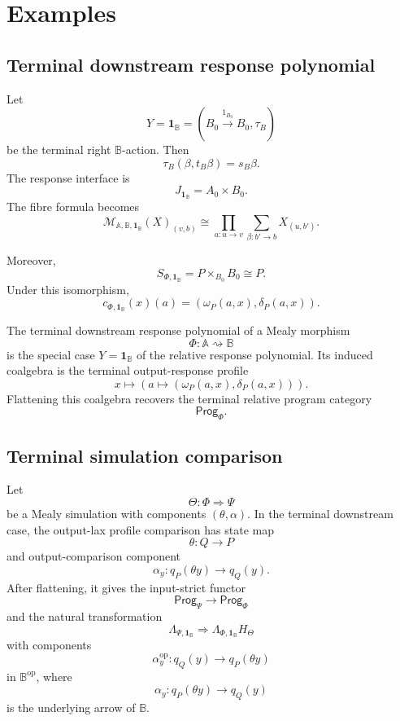 \section{Examples}
\label{sec:poly-relative-examples}

\subsection{Terminal downstream response polynomial}
\label{subsec:poly-relative-example-terminal-downstream-response}

Let
\[
Y=\mathbf 1_{\mathbb B}
=
(B_0\xrightarrow{1_{B_0}}B_0,\tau_B)
\]
be the terminal right \(\mathbb B\)-action.  Then
\[
\tau_B(\beta,t_B\beta)=s_B\beta.
\]
The response interface is
\[
J_{\mathbf 1_{\mathbb B}}=A_0\times B_0.
\]
The fibre formula becomes
\[
\mathcal M_{\mathbb A,\mathbb B,\mathbf 1_{\mathbb B}}(X)_{(v,b)}
\cong
\prod_{a:u\to v}
\sum_{\beta:b'\to b}
X_{(u,b')}.
\]

Moreover,
\[
S_{\Phi,\mathbf 1_{\mathbb B}}
=
P\times_{B_0}B_0
\cong P.
\]
Under this isomorphism,
\[
c_{\Phi,\mathbf 1_{\mathbb B}}(x)(a)
=
(\omega_P(a,x),\delta_P(a,x)).
\]

\begin{corollary}
\label{cor:poly-relative-terminal-mealy-polynomial}
The terminal downstream response polynomial of a Mealy morphism
\[
\Phi:\mathbb A\rightsquigarrow\mathbb B
\]
is the special case \(Y=\mathbf 1_{\mathbb B}\) of the relative response
polynomial.  Its induced coalgebra is the terminal output-response profile
\[
x
\longmapsto
\left(
a
\longmapsto(\omega_P(a,x),\delta_P(a,x))
\right).
\]
Flattening this coalgebra recovers the terminal relative program category
\[
\mathsf{Prog}_\Phi.
\]
\end{corollary}

\subsection{Terminal simulation comparison}
\label{subsec:poly-relative-example-terminal-simulation}

\begin{proposition}
\label{prop:poly-relative-terminal-simulation-comparison}
Let
\[
\Theta:\Phi\Rightarrow\Psi
\]
be a Mealy simulation with components \((\theta,\alpha)\).  In the terminal
downstream case, the output-lax profile comparison has state map
\[
\theta:Q\to P
\]
and output-comparison component
\[
\alpha_y:q_P(\theta y)\to q_Q(y).
\]
After flattening, it gives the input-strict functor
\[
\mathsf{Prog}_\Psi\to\mathsf{Prog}_\Phi
\]
and the natural transformation
\[
\Lambda_{\Psi,\mathbf 1_{\mathbb B}}
\Rightarrow
\Lambda_{\Phi,\mathbf 1_{\mathbb B}}H_\Theta
\]
with components
\[
\alpha_y^{\mathrm{op}}:
q_Q(y)\longrightarrow q_P(\theta y)
\]
in \(\mathbb B^{\mathrm{op}}\), where
\[
\alpha_y:q_P(\theta y)\to q_Q(y)
\]
is the underlying arrow of \(\mathbb B\).
\end{proposition}

